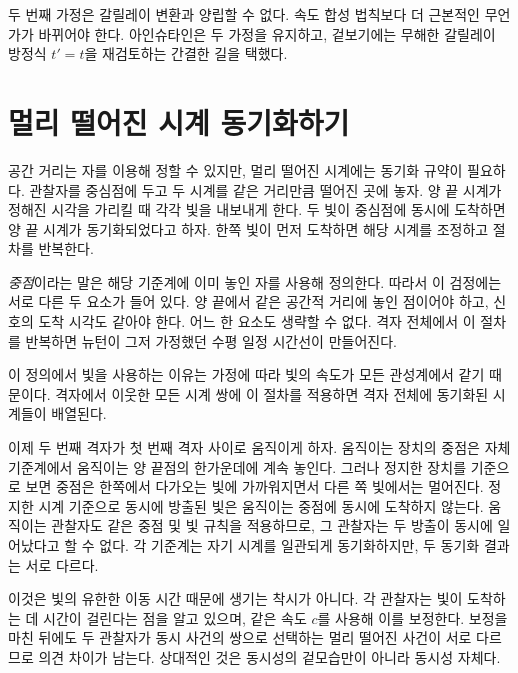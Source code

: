 두 번째 가정은 갈릴레이 변환과 양립할 수 없다. 속도 합성 법칙보다 더 근본적인 무언가가 바뀌어야 한다. 아인슈타인은 두 가정을 유지하고, 겉보기에는 무해한 갈릴레이 방정식 \(t'=t\)을 재검토하는 간결한 길을 택했다.

\section{멀리 떨어진 시계 동기화하기}

공간 거리는 자를 이용해 정할 수 있지만, 멀리 떨어진 시계에는 동기화 규약이 필요하다. 관찰자를 중심점에 두고 두 시계를 같은 거리만큼 떨어진 곳에 놓자. 양 끝 시계가 정해진 시각을 가리킬 때 각각 빛을 내보내게 한다. 두 빛이 중심점에 동시에 도착하면 양 끝 시계가 동기화되었다고 하자. 한쪽 빛이 먼저 도착하면 해당 시계를 조정하고 절차를 반복한다.

\emph{중점}이라는 말은 해당 기준계에 이미 놓인 자를 사용해 정의한다. 따라서 이 검정에는 서로 다른 두 요소가 들어 있다. 양 끝에서 같은 공간적 거리에 놓인 점이어야 하고, 신호의 도착 시각도 같아야 한다. 어느 한 요소도 생략할 수 없다. 격자 전체에서 이 절차를 반복하면 뉴턴이 그저 가정했던 수평 일정 시간선이 만들어진다.

이 정의에서 빛을 사용하는 이유는 가정에 따라 빛의 속도가 모든 관성계에서 같기 때문이다. 격자에서 이웃한 모든 시계 쌍에 이 절차를 적용하면 격자 전체에 동기화된 시계들이 배열된다.

이제 두 번째 격자가 첫 번째 격자 사이로 움직이게 하자. 움직이는 장치의 중점은 자체 기준계에서 움직이는 양 끝점의 한가운데에 계속 놓인다. 그러나 정지한 장치를 기준으로 보면 중점은 한쪽에서 다가오는 빛에 가까워지면서 다른 쪽 빛에서는 멀어진다. 정지한 시계 기준으로 동시에 방출된 빛은 움직이는 중점에 동시에 도착하지 않는다. 움직이는 관찰자도 같은 중점 및 빛 규칙을 적용하므로, 그 관찰자는 두 방출이 동시에 일어났다고 할 수 없다. 각 기준계는 자기 시계를 일관되게 동기화하지만, 두 동기화 결과는 서로 다르다.

이것은 빛의 유한한 이동 시간 때문에 생기는 착시가 아니다. 각 관찰자는 빛이 도착하는 데 시간이 걸린다는 점을 알고 있으며, 같은 속도 \(c\)를 사용해 이를 보정한다. 보정을 마친 뒤에도 두 관찰자가 동시 사건의 쌍으로 선택하는 멀리 떨어진 사건이 서로 다르므로 의견 차이가 남는다. 상대적인 것은 동시성의 겉모습만이 아니라 동시성 자체다.

\begin{classroomqa}
\end{classroomqa}

